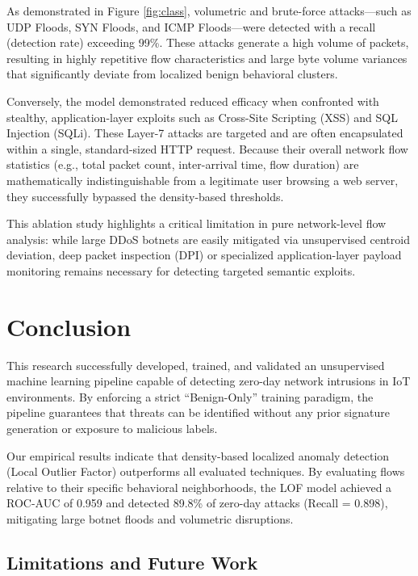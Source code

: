 \documentclass{article}
\begin{document}
As demonstrated in Figure \ref{fig:class}, volumetric and brute-force attacks---such as UDP Floods, SYN Floods, and ICMP Floods---were detected with a recall (detection rate) exceeding 99\%. These attacks generate a high volume of packets, resulting in highly repetitive flow characteristics and large byte volume variances that significantly deviate from localized benign behavioral clusters. 

Conversely, the model demonstrated reduced efficacy when confronted with stealthy, application-layer exploits such as Cross-Site Scripting (XSS) and SQL Injection (SQLi). These Layer-7 attacks are targeted and are often encapsulated within a single, standard-sized HTTP request. Because their overall network flow statistics (e.g., total packet count, inter-arrival time, flow duration) are mathematically indistinguishable from a legitimate user browsing a web server, they successfully bypassed the density-based thresholds. 

This ablation study highlights a critical limitation in pure network-level flow analysis: while large DDoS botnets are easily mitigated via unsupervised centroid deviation, deep packet inspection (DPI) or specialized application-layer payload monitoring remains necessary for detecting targeted semantic exploits.

\section{Conclusion}

This research successfully developed, trained, and validated an unsupervised machine learning pipeline capable of detecting zero-day network intrusions in IoT environments. By enforcing a strict ``Benign-Only'' training paradigm, the pipeline guarantees that threats can be identified without any prior signature generation or exposure to malicious labels.

Our empirical results indicate that density-based localized anomaly detection (Local Outlier Factor) outperforms all evaluated techniques. By evaluating flows relative to their specific behavioral neighborhoods, the LOF model achieved a ROC-AUC of 0.959 and detected 89.8\% of zero-day attacks (Recall = 0.898), mitigating large botnet floods and volumetric disruptions.

\subsection{Limitations and Future Work}
\end{document}
